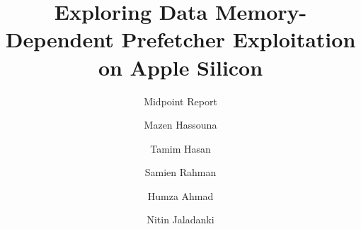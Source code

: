 \documentclass[sigplan,screen,10pt]{acmart}
\begin{document}
\title{Exploring Data Memory-Dependent Prefetcher Exploitation on Apple Silicon}
\subtitle{Midpoint Report}
\author{Mazen Hassouna}
\author{Tamim Hasan}
\author{Samien Rahman}
\author{Humza Ahmad}
\author{Nitin Jaladanki}
\renewcommand{\shortauthors}{Hassouna et al.}

\maketitle








\end{document}
